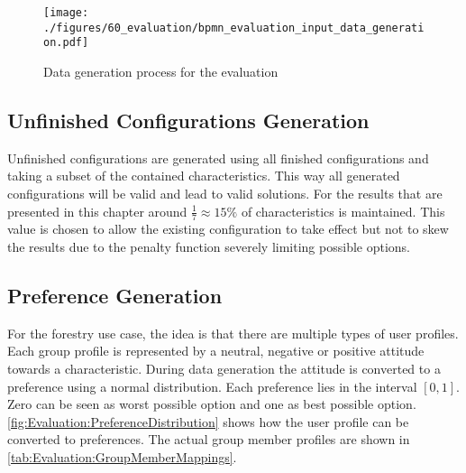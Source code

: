 \begin{figure}
    \centering
    \texttt{[image: ./figures/60\_evaluation/bpmn\_evaluation\_input\_data\_generation.pdf]}
    \caption{Data generation process for the evaluation}
    \label{fig:Evaluation:GeneratingDataProcess}
\end{figure}

\subsection{Unfinished Configurations Generation}

Unfinished configurations are generated using all finished configurations and taking a subset of the contained characteristics. This way all generated configurations will be valid and lead to valid solutions. For the results that are presented in this chapter around $\frac{1}{7} \approx 15\%$ of characteristics is maintained. This value is chosen to allow the existing configuration to take effect but not to skew the results due to the penalty function severely limiting possible options.

\subsection{Preference Generation}

For the forestry use case, the idea is that there are multiple types of user profiles. Each group profile is represented by a neutral, negative or positive attitude towards a characteristic. During data generation the attitude is converted to a preference using a normal distribution. Each preference lies in the interval $[0,1]$. Zero can be seen as worst possible option and one as best possible option. \autoref{fig:Evaluation:PreferenceDistribution} shows how the user profile can be converted to preferences. The actual group member profiles are shown in \autoref{tab:Evaluation:GroupMemberMappings}.

